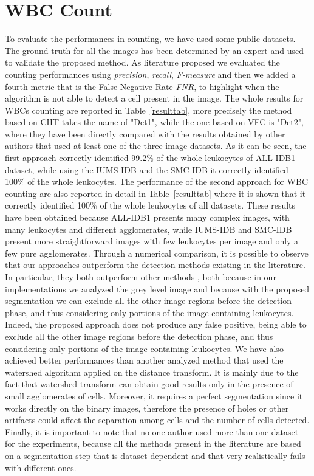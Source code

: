 \documentclass[final,a4paper,12pt,english]{UnicaPhdThesis3}
\begin{document}
{\section{WBC Count} %
To evaluate the performances in counting, we have used some public datasets.
The ground truth for all the images has been determined by an expert and used to validate the proposed method. As literature proposed we evaluated the counting performances using \textit{precision}, \textit{recall}, \textit{F-measure} and then we added a fourth metric that is the False Negative Rate \textit{FNR}, to highlight when the algorithm is not able to detect a cell present in the image. The whole results for WBCs counting are reported in Table~\ref{resulttab}, more precisely the method based on CHT takes the name of "Det1", while the one based on VFC is "Det2", where they have been directly compared with the results obtained by other authors that used at least one of the three image datasets. 
As it can be seen, the first approach correctly identified 99.2\% of the whole leukocytes of ALL-IDB1 dataset, while using the IUMS-IDB and the SMC-IDB it correctly identified 100\% of the whole leukocytes. The performance of the second approach for WBC counting are also reported in detail in Table~\ref{resulttab} where it is shown that it correctly identified 100\% of the whole leukocytes of all datasets. These results have been obtained because ALL-IDB1 presents many complex images, with many leukocytes and different agglomerates, while IUMS-IDB and SMC-IDB present more straightforward images with few leukocytes per image and only a few pure agglomerates. Through a numerical comparison, it is possible to observe that our approaches outperform the detection methods existing in the literature. In particular, they both outperform other methods \cite{Mahmood, Alomari}, both because in our implementations we analyzed the grey level image and because with the proposed segmentation we can exclude all the other image regions before the detection phase, and thus considering only portions of the image containing leukocytes. Indeed, the proposed approach does not produce any false positive, being able to exclude all the other image regions before the detection phase, and thus considering only portions of the image containing leukocytes. We have also achieved better performances than another analyzed method \cite{Put14b} that used the watershed algorithm applied on the distance transform. It is mainly due to the fact that watershed transform can obtain good results only in the presence of small agglomerates of cells.
Moreover, it requires a perfect segmentation since it works directly on the binary images, therefore the presence of holes or other artifacts could affect the separation among cells and the number of cells detected. Finally, it is important to note that no one author used more than one dataset for the experiments, because all the methods present in the literature are based on a segmentation step that is dataset-dependent and that very realistically fails with different ones.

}
\end{document}
